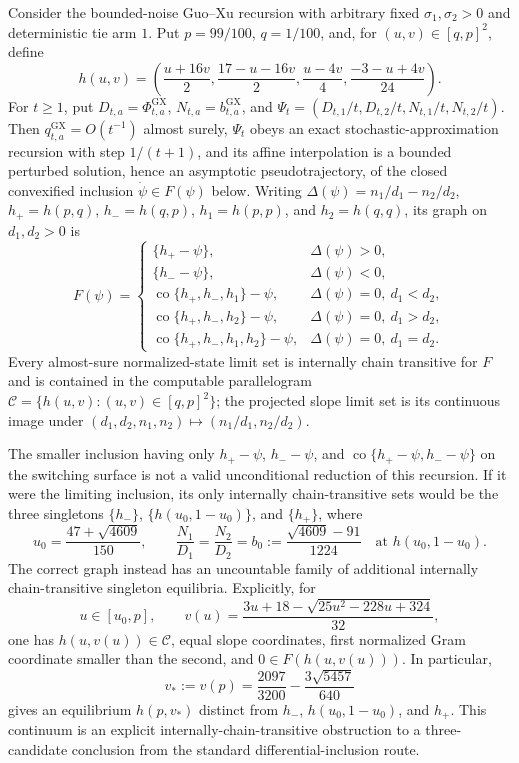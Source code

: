 Consider the bounded-noise Guo--Xu recursion with arbitrary fixed \(\sigma_1,\sigma_2>0\) and deterministic tie arm \(1\). Put \(p=99/100\), \(q=1/100\), and, for \((u,v)\in[q,p]^2\), define
\[
 h(u,v)=\left(\frac{u+16v}{2},\frac{17-u-16v}{2},
                 \frac{u-4v}{4},\frac{-3-u+4v}{24}\right).
\]
For \(t\ge1\), put \(D_{t,a}=\Phi^{\mathrm{GX}}_{t,a}\), \(N_{t,a}=b^{\mathrm{GX}}_{t,a}\), and \(\Psi_t=(D_{t,1}/t,D_{t,2}/t,N_{t,1}/t,N_{t,2}/t)\). Then \(q^{\mathrm{GX}}_{t,a}=O(t^{-1})\) almost surely, \(\Psi_t\) obeys an exact stochastic-approximation recursion with step \(1/(t+1)\), and its affine interpolation is a bounded perturbed solution, hence an asymptotic pseudotrajectory, of the closed convexified inclusion \(\dot\psi\in F(\psi)\) below. Writing \(\Delta(\psi)=n_1/d_1-n_2/d_2\), \(h_+=h(p,q)\), \(h_-=h(q,p)\), \(h_1=h(p,p)\), and \(h_2=h(q,q)\), its graph on \(d_1,d_2>0\) is
\[
 F(\psi)=
 \begin{cases}
  \{h_+-\psi\},&\Delta(\psi)>0,\\
  \{h_--\psi\},&\Delta(\psi)<0,\\
  \operatorname{co}\{h_+,h_-,h_1\}-\psi,&\Delta(\psi)=0,\ d_1<d_2,\\
  \operatorname{co}\{h_+,h_-,h_2\}-\psi,&\Delta(\psi)=0,\ d_1>d_2,\\
  \operatorname{co}\{h_+,h_-,h_1,h_2\}-\psi,&\Delta(\psi)=0,\ d_1=d_2.
 \end{cases}
\]
Every almost-sure normalized-state limit set is internally chain transitive for \(F\) and is contained in the computable parallelogram \(\mathcal C=\{h(u,v):(u,v)\in[q,p]^2\}\); the projected slope limit set is its continuous image under \((d_1,d_2,n_1,n_2)\mapsto(n_1/d_1,n_2/d_2)\).

The smaller inclusion having only \(h_+-\psi\), \(h_--\psi\), and \(\operatorname{co}\{h_+-\psi,h_--\psi\}\) on the switching surface is not a valid unconditional reduction of this recursion. If it were the limiting inclusion, its only internally chain-transitive sets would be the three singletons \(\{h_-\}\), \(\{h(u_0,1-u_0)\}\), and \(\{h_+\}\), where
\[
 u_0=\frac{47+\sqrt{4609}}{150},\qquad
 \frac{N_1}{D_1}=\frac{N_2}{D_2}
 =b_0:=\frac{\sqrt{4609}-91}{1224}
 \quad\text{at }h(u_0,1-u_0).
\]
The correct graph instead has an uncountable family of additional internally chain-transitive singleton equilibria. Explicitly, for
\[
 u\in[u_0,p],\qquad
 v(u)=\frac{3u+18-\sqrt{25u^2-228u+324}}{32},
\]
one has \(h(u,v(u))\in\mathcal C\), equal slope coordinates, first normalized Gram coordinate smaller than the second, and \(0\in F(h(u,v(u)))\). In particular,
\[
 v_*:=v(p)=\frac{2097}{3200}-\frac{3\sqrt{5457}}{640}
\]
gives an equilibrium \(h(p,v_*)\) distinct from \(h_-\), \(h(u_0,1-u_0)\), and \(h_+\). This continuum is an explicit internally-chain-transitive obstruction to a three-candidate conclusion from the standard differential-inclusion route.

